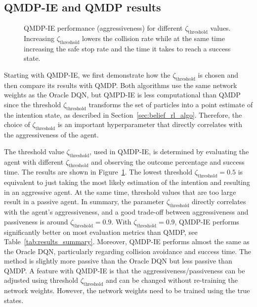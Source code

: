 \subsection{QMDP-IE and QMDP results}
\begin{figure}[!t]
    \centering
        
        \vspace{-0.8cm}
        \caption{QMDP-IE performance (aggressiveness) for different $\zeta_\text{threshold}$ values. Increasing $\zeta_\text{threshold}$ lowers the collision rate while at the same time increasing the safe stop rate and the time it takes to reach a success state.}
    \label{fig:intent_threshold}
\end{figure}
Starting with QMDP-IE, we first demonstrate how the $\zeta_\text{threshold}$ is chosen and then compare its results with QMDP. Both algorithms use the same network weights as the Oracle DQN, but QMPD-IE is less computational than QMDP since the threshold $\zeta_\text{threshold}$ transforms the set of particles into a point estimate of the intention state, as described in Section~\ref{sec:belief_rl_algo}. Therefore, the choice of $\zeta_\text{threshold}$ is an important hyperparameter that directly correlates with the aggressiveness of the agent.

The threshold value $\zeta_\text{threshold}$, used in QMDP-IE, is determined by evaluating the agent with different $\zeta_\text{threshold}$ and observing the outcome percentage and success time. The results are shown in Figure~\ref{fig:intent_threshold}. The lowest threshold $\zeta_\text{threshold}=0.5$ is equivalent to just taking the most likely estimation of the intention and resulting in an aggressive agent. At the same time, threshold values that are too large result in a passive agent. In summary, the parameter $\zeta_\text{threshold}$ directly correlates with the agent's aggressiveness, and a good trade-off between aggressiveness and passiveness is around $\zeta_\text{threshold}=0.9$. 
With $\zeta_\text{threshold}=0.9$, QMDP-IE performs significantly better on most evaluation metrics than QMDP, see Table~\ref{tab:results_summary}. 
Moreover, QMDP-IE performs almost the same as the Oracle DQN, particularly regarding collision avoidance and success time. The method is slightly more passive than the Oracle DQN but less passive than QMDP. A feature with QMDP-IE is that the aggressiveness/passiveness can be adjusted using threshold $\zeta_\text{threshold}$ and can be changed without re-training the network weights. However, the network weights need to be trained using the true states.  

